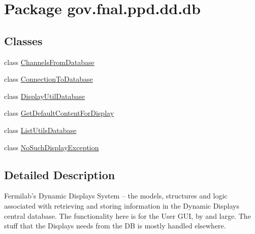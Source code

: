 \hypertarget{namespacegov_1_1fnal_1_1ppd_1_1dd_1_1db}{\section{Package gov.\-fnal.\-ppd.\-dd.\-db}
\label{namespacegov_1_1fnal_1_1ppd_1_1dd_1_1db}
}
\subsection*{Classes}
\begin{DoxyCompactItemize}
\item 
class \hyperlink{classgov_1_1fnal_1_1ppd_1_1dd_1_1db_1_1ChannelsFromDatabase}{Channels\-From\-Database}
\item 
class \hyperlink{classgov_1_1fnal_1_1ppd_1_1dd_1_1db_1_1ConnectionToDatabase}{Connection\-To\-Database}
\item 
class \hyperlink{classgov_1_1fnal_1_1ppd_1_1dd_1_1db_1_1DisplayUtilDatabase}{Display\-Util\-Database}
\item 
class \hyperlink{classgov_1_1fnal_1_1ppd_1_1dd_1_1db_1_1GetDefaultContentForDisplay}{Get\-Default\-Content\-For\-Display}
\item 
class \hyperlink{classgov_1_1fnal_1_1ppd_1_1dd_1_1db_1_1ListUtilsDatabase}{List\-Utils\-Database}
\item 
class \hyperlink{classgov_1_1fnal_1_1ppd_1_1dd_1_1db_1_1NoSuchDisplayException}{No\-Such\-Display\-Exception}
\end{DoxyCompactItemize}


\subsection{Detailed Description}
Fermilab's Dynamic Displays System -- the models, structures and logic associated with retrieving and storing information in the Dynamic Displays central database. The functionality here is for the User G\-U\-I, by and large. The stuff that the Displays needs from the D\-B is mostly handled elsewhere.